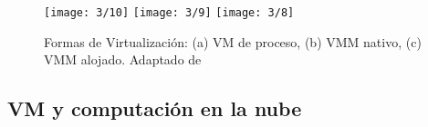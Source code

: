 		
		  \begin{figure}   
		  	 \begin{center} %
			\texttt{[image: 3/10]}
			\texttt{[image: 3/9]}
			\texttt{[image: 3/8]}
			\caption{Formas de Virtualización: (a) VM de proceso, (b) VMM nativo, (c) VMM alojado. Adaptado  de \cite{Steen2017} }
			\label{fig:virtualizacion-tipo}
		 \end{center} 
	 \end{figure} 
		

	
\subsection{ VM y computación en la nube }
